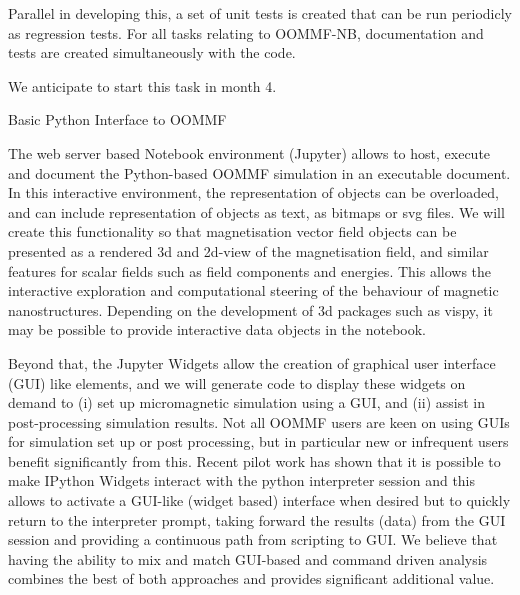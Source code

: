 \begin{workpackage}
\begin{tasklist}
\begin{task}[id=oommf-python-interface,title=OOMMF case study: Create Python interface to OOMMF code]
  Parallel in developing this, a set of unit tests is created that can
  be run periodicly as regression tests. For all tasks relating to
  OOMMF-NB, documentation and tests are created simultaneously with
  the code.

  We anticipate to start this task 
  in month 4.
\end{task}
\end{tasklist}

\begin{wpdelivs}
  \begin{wpdeliv}[due=9,id=oommf-py-raw,dissem=??,nature=??]
      {Basic Python Interface to OOMMF}
\end{wpdeliv}
\end{wpdelivs}

\begin{tasklist}
\begin{task}[title=OOMMF case study: Extend \texttt{OOMMF-py} with IPython
    notebook attributes and GUI templates]

  The web server based Notebook environment (Jupyter) allows to host,
  execute and document the Python-based OOMMF simulation in an
  executable document. In this interactive environment, the
  representation of objects can be overloaded, and can include
  representation of objects as text, as bitmaps or svg files. We will
  create this functionality so that magnetisation vector field objects
  can be presented as a rendered 3d and 2d-view of the magnetisation
  field, and similar features for scalar fields such as field
  components and energies. This allows the interactive exploration and
  computational steering of the behaviour of magnetic
  nanostructures. Depending on the development of 3d packages such as
  vispy, it may be possible to provide interactive data objects in the
  notebook.

  Beyond that, the Jupyter Widgets allow the creation of graphical
  user interface (GUI) like elements, and we will generate code to
  display these widgets on demand to (i) set up micromagnetic
  simulation using a GUI, and (ii) assist in post-processing
  simulation results. Not all OOMMF users are keen on using GUIs for
  simulation set up or post processing, but in particular new or
  infrequent users benefit significantly from this. Recent pilot work
  has shown that it is possible to make IPython Widgets interact with
  the python interpreter session and this allows to activate a
  GUI-like (widget based) interface when desired but to quickly return
  to the interpreter prompt, taking forward the results (data) from
  the GUI session \cite{IPython-widget-GUI-demo-youtube-2014} and
  providing a continuous path from scripting to GUI. We
  believe that having the ability to mix and match GUI-based and
  command driven analysis combines the best of both approaches and
  provides significant additional value.
\end{task}
\end{tasklist}


\end{workpackage}
